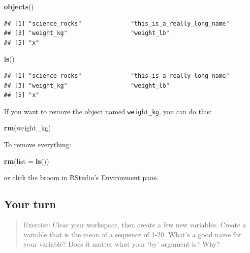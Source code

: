 \documentclass[]{book}
\newenvironment{Shaded}{\begin{snugshade}}{\end{snugshade}}
\newcommand{\KeywordTok}[1]{\textcolor[rgb]{0.13,0.29,0.53}{\textbf{{#1}}}}
\newcommand{\DataTypeTok}[1]{\textcolor[rgb]{0.13,0.29,0.53}{{#1}}}
\newcommand{\NormalTok}[1]{{#1}}
\theoremstyle{definition}
\theoremstyle{definition}
\theoremstyle{definition}
\theoremstyle{remark}
\begin{document}
\begin{Shaded}
\begin{Highlighting}[]
\KeywordTok{objects}\NormalTok{()}
\end{Highlighting}
\end{Shaded}

\begin{verbatim}
## [1] "science_rocks"              "this_is_a_really_long_name"
## [3] "weight_kg"                  "weight_lb"                 
## [5] "x"
\end{verbatim}

\begin{Shaded}
\begin{Highlighting}[]
\KeywordTok{ls}\NormalTok{()}
\end{Highlighting}
\end{Shaded}

\begin{verbatim}
## [1] "science_rocks"              "this_is_a_really_long_name"
## [3] "weight_kg"                  "weight_lb"                 
## [5] "x"
\end{verbatim}

If you want to remove the object named \texttt{weight\_kg}, you can do
this:

\begin{Shaded}
\begin{Highlighting}[]
\KeywordTok{rm}\NormalTok{(weight_kg)}
\end{Highlighting}
\end{Shaded}

To remove everything:

\begin{Shaded}
\begin{Highlighting}[]
\KeywordTok{rm}\NormalTok{(}\DataTypeTok{list =} \KeywordTok{ls}\NormalTok{())}
\end{Highlighting}
\end{Shaded}

or click the broom in RStudio's Environment pane.

\subsection{Your turn}\label{your-turn-1}

\begin{quote}
Exercise: Clear your workspace, then create a few new variables. Create
a variable that is the mean of a sequence of 1-20. What's a good name
for your variable? Does it matter what your `by' argument is? Why?
\end{quote}
\end{document}
